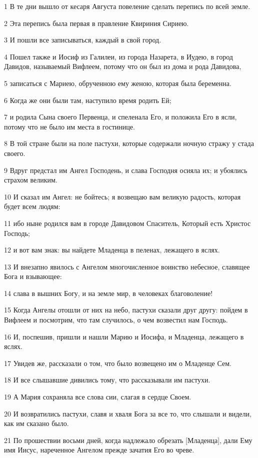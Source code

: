 \par 1 В те дни вышло от кесаря Августа повеление сделать перепись по всей земле.
\par 2 Эта перепись была первая в правление Квириния Сириею.
\par 3 И пошли все записываться, каждый в свой город.
\par 4 Пошел также и Иосиф из Галилеи, из города Назарета, в Иудею, в город Давидов, называемый Вифлеем, потому что он был из дома и рода Давидова,
\par 5 записаться с Мариею, обрученною ему женою, которая была беременна.
\par 6 Когда же они были там, наступило время родить Ей;
\par 7 и родила Сына своего Первенца, и спеленала Его, и положила Его в ясли, потому что не было им места в гостинице.
\par 8 В той стране были на поле пастухи, которые содержали ночную стражу у стада своего.
\par 9 Вдруг предстал им Ангел Господень, и слава Господня осияла их; и убоялись страхом великим.
\par 10 И сказал им Ангел: не бойтесь; я возвещаю вам великую радость, которая будет всем людям:
\par 11 ибо ныне родился вам в городе Давидовом Спаситель, Который есть Христос Господь;
\par 12 и вот вам знак: вы найдете Младенца в пеленах, лежащего в яслях.
\par 13 И внезапно явилось с Ангелом многочисленное воинство небесное, славящее Бога и взывающее:
\par 14 слава в вышних Богу, и на земле мир, в человеках благоволение!
\par 15 Когда Ангелы отошли от них на небо, пастухи сказали друг другу: пойдем в Вифлеем и посмотрим, что там случилось, о чем возвестил нам Господь.
\par 16 И, поспешив, пришли и нашли Марию и Иосифа, и Младенца, лежащего в яслях.
\par 17 Увидев же, рассказали о том, что было возвещено им о Младенце Сем.
\par 18 И все слышавшие дивились тому, что рассказывали им пастухи.
\par 19 А Мария сохраняла все слова сии, слагая в сердце Своем.
\par 20 И возвратились пастухи, славя и хваля Бога за все то, что слышали и видели, как им сказано было.
\par 21 По прошествии восьми дней, когда надлежало обрезать [Младенца], дали Ему имя Иисус, нареченное Ангелом прежде зачатия Его во чреве.
